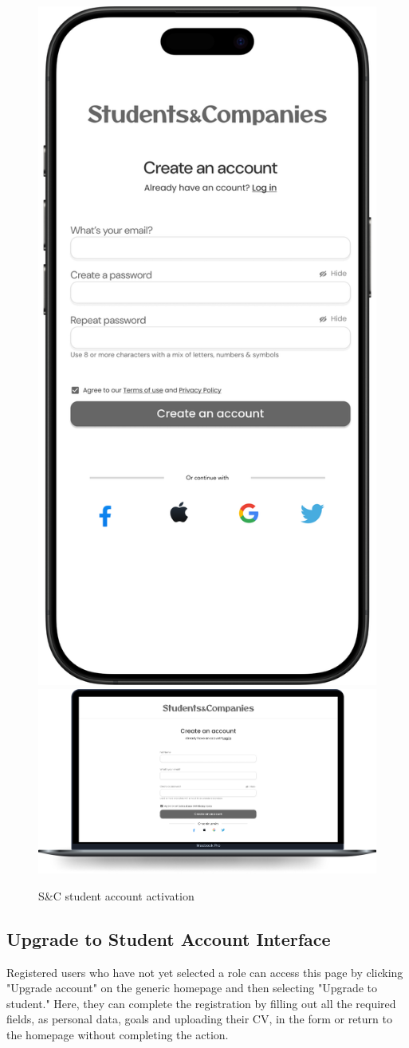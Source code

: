 \begin{figure}[H]
    \centering
    \includegraphics[width=0.2\linewidth]{Images/Mock-up/RegistrationMobile.png}
    \includegraphics[width=0.75\linewidth]{Images/Mock-up/RegistrationPagePC.png}
    \caption{S\&C student account activation}
    \label{fig:homepage-design}
\end{figure}

\subsection{Upgrade to Student Account Interface}

Registered users who have not yet selected a role can access this page by clicking "Upgrade account" on the generic homepage and then selecting "Upgrade to student." Here, they can complete the registration by filling out all the required fields, as personal data, goals and uploading their CV, in the form or return to the homepage without completing the action. \\

